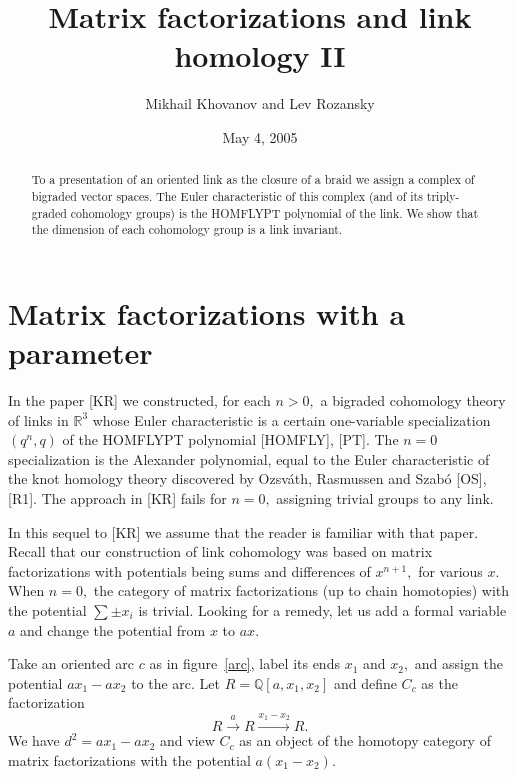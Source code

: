 \documentclass[12pt]{article}
\title{Matrix factorizations and link homology II}
\author{ Mikhail Khovanov and Lev Rozansky}
\date{May 4, 2005}
\begin{document}
 

\maketitle
\baselineskip 14pt
 
\def\R{\mathbb R}
\def\Q{\mathbb Q}
\def\Z{\mathbb Z}
\def\l{\lbrace}
\def\r{\rbrace}
\def\o{\otimes}
\def\lra{\longrightarrow}
\def\Hom{\mathrm{Hom}}
\def\RHom{\mathrm{RHom}}
\def\Id{\mathrm{Id}}
\newcommand{\define}{\stackrel{\mbox{\scriptsize{def}}}{=}}
\def\drawing#1{\begin{center}\epsfig{file=#1}\end{center}}
 
\begin{abstract} To a presentation of an oriented link as the closure of a 
braid 
we assign a complex of bigraded vector spaces. The Euler characteristic of 
this complex (and of its triply-graded cohomology groups) 
is the HOMFLYPT polynomial of the link. We show that the dimension of 
each cohomology group is a link invariant. 
\end{abstract}

  
\section{Matrix factorizations with a parameter}\label{section-one}

In the paper [KR] we constructed, for each $n>0,$ 
a bigraded cohomology theory of links in $\R^3$ whose Euler characteristic 
is a certain one-variable specialization $(q^n,q)$ of the HOMFLYPT polynomial
[HOMFLY], [PT]. The $n=0$ specialization is the Alexander polynomial, 
equal to the Euler characteristic of the knot homology theory discovered by 
Ozsv\'ath, Rasmussen and Szab\'o [OS], [R1]. The approach in [KR] fails for $n=0,$ 
assigning trivial groups to any link. 

In this sequel to [KR] we assume that the reader is familiar 
with that paper. Recall that our construction of link cohomology was based 
on matrix factorizations with 
potentials being sums and differences of $x^{n+1},$ for various $x.$ 
When $n=0,$ the category of matrix factorizations (up to chain homotopies) 
with the potential $\sum \pm x_i$ is trivial. Looking for a remedy, let us add 
a formal variable $a$ and change the potential from $x$ to $ax.$ 

Take an oriented arc $c$ as in figure~\ref{arc}, 
 label its ends $x_1$ and $x_2,$ 
and assign the potential $ax_1 - ax_2$ to the arc. Let 
$R=\Q[a,x_1,x_2]$ and define $C_c$ as the factorization
 $$ R \stackrel{a}{\lra} R \xrightarrow{x_1 -x_2} R.$$ 
We have $d^2= ax_1 - ax_2$ and view $C_c$ as an object 
of the homotopy category of matrix factorizations with the 
potential $a(x_1-x_2).$ 
\end{document}
